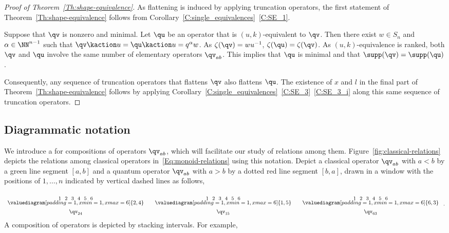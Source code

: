 \begin{proof}[Proof of Theorem~\ref{Th:shape-equivalence}]
  As flattening is induced by applying truncation operators, the first statement of Theorem~\ref{Th:shape-equivalence} follows
  from Corollary~\ref{C:single_equivalences}~\ref{C:SE_1}.

  Suppose that $\qv$ is nonzero and minimal.
  Let $\qu$ be an operator that is $(u,k)$-equivalent to $\qv$.
  Then there exist $w\in S_n$ and $\alpha\in\NN^{n-1}$ such that $\qv\kaction u=\qu\kaction u=q^\alpha w$.
  As $\zeta(\qv)=wu^{-1}$, $\zeta(\qu)=\zeta(\qv)$.
  As $(u,k)$-equivalence is ranked, both $\qv$ and $\qu$ involve the same number of elementary operators $\qv_{ab}$.
  This implies that $\qu$ is minimal and that $\supp(\qv)=\supp(\qu)$.

  Consequently, any sequence of truncation operators that flattens $\qv$ also flattens $\qu$.
  The existence of $x$ and $l$ in the final part of Theorem~\ref{Th:shape-equivalence} follows by applying 
  Corollary~\ref{C:single_equivalences}~\ref{C:SE_3}~\ref{C:SE_3_i} along  this same sequence of truncation operators.  
\end{proof}

\subsection{Diagrammatic notation}
\label{SS:diagrammatic-notation}
We introduce a  for compositions of operators $\qv_{ab}$, which  will facilitate our study of relations
among them.
Figure~\ref{fig:classical-relations} depicts the relations among classical operators in~\eqref{Eq:monoid-relations} using this notation.
Depict a classical operator $\qv_{ab}$ with $a<b$ by a green line segment $[a,b]$
and a quantum operator $\qv_{ab}$ with $a>b$ by a dotted red line segment $[b,a]$,
drawn in a window with the positions of $1,\dotsc,n$ indicated by vertical
dashed lines as follows,
\newcommand{\labelhack}{\begin{picture}(62,2)
   \put(0 ,-4){{\small 1}}\put(11.5,-4){{\small 2}}
   \put(23,-4){{\small 3}}\put(34.5,-4){{\small 4}}
   \put(46,-4){{\small 5}}\put(57.5,-4){{\small 6}}\end{picture}}

\[
\begin{array}{c@{\qquad}c@{\qquad}c}
    \labelhack& \labelhack& \labelhack   \\
    \valuediagram[padding=1, xmin=1, xmax=6]{{2,4}}
    &
    \valuediagram[padding=1, xmin=1, xmax=6]{{1,5}}
    &
    \valuediagram[padding=1, xmin=1, xmax=6]{{6,3}}
    \\[1ex]
    \qv_{24} & \qv_{15} & \qv_{63}
\end{array}\ .
\]
A composition of operators is depicted by stacking intervals.
For example,

